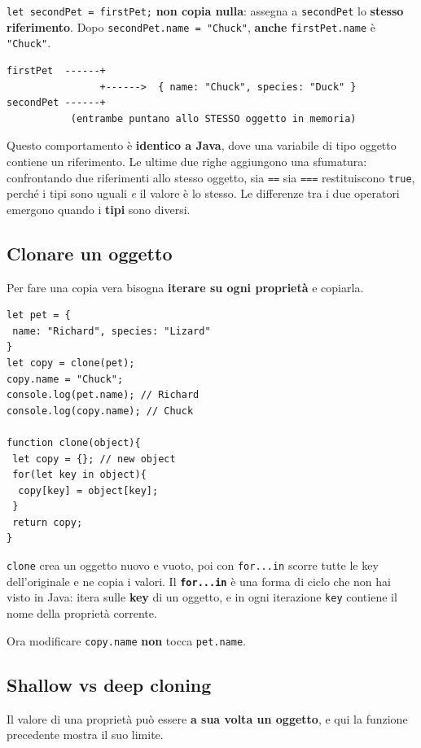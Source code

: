 \documentclass[10pt,a4paper]{article}
\begin{document}
\texttt{let secondPet = firstPet;} \textbf{non copia nulla}: assegna a \texttt{secondPet} lo \textbf{stesso riferimento}. Dopo \texttt{secondPet.name = "Chuck"}, \textbf{anche} \texttt{firstPet.name} è \texttt{"Chuck"}.

\begin{lstlisting}[style=plain]
firstPet  ------+
                +------>  { name: "Chuck", species: "Duck" }
secondPet ------+
           (entrambe puntano allo STESSO oggetto in memoria)
\end{lstlisting}

Questo comportamento è \textbf{identico a Java}, dove una variabile di tipo oggetto contiene un riferimento. Le ultime due righe aggiungono una sfumatura: confrontando due riferimenti allo stesso oggetto, sia \texttt{==} sia \texttt{===} restituiscono \texttt{true}, perché i tipi sono uguali \emph{e} il valore è lo stesso. Le differenze tra i due operatori emergono quando i \textbf{tipi} sono diversi.

\subsection{Clonare un oggetto}

Per fare una copia vera bisogna \textbf{iterare su ogni proprietà} e copiarla.

\begin{lstlisting}[style=js]
let pet = {
 name: "Richard", species: "Lizard"
}
let copy = clone(pet);
copy.name = "Chuck";
console.log(pet.name); // Richard
console.log(copy.name); // Chuck

function clone(object){
 let copy = {}; // new object
 for(let key in object){
  copy[key] = object[key];
 }
 return copy;
}
\end{lstlisting}

\texttt{clone} crea un oggetto nuovo e vuoto, poi con \texttt{for...in} scorre tutte le key dell'originale e ne copia i valori. Il \textbf{\texttt{for...in}} è una forma di ciclo che non hai visto in Java: itera sulle \textbf{key} di un oggetto, e in ogni iterazione \texttt{key} contiene il nome della proprietà corrente.

Ora modificare \texttt{copy.name} \textbf{non} tocca \texttt{pet.name}.

\subsection{Shallow vs deep cloning}

Il valore di una proprietà può essere \textbf{a sua volta un oggetto}, e qui la funzione precedente mostra il suo limite.
\end{document}
